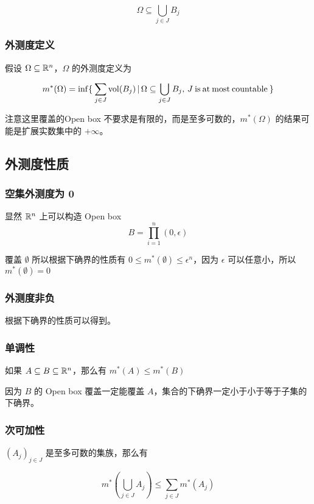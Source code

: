 \[
\Omega \subseteq \bigcup_{j \in J} B_j
\]

\subsubsection{外测度定义}

假设 $\Omega \subseteq \mathbb{R}^n$，$\Omega$ 的外测度定义为

\[
m^*(\Omega) = \inf \{\: \sum_{j \in J}\mathrm{vol}(B_j) \,\vert\, \Omega \subseteq \bigcup_{j \in J}B_j,\, J \: \mathrm{ is \: at \: most \: countable} \:\}
\]

注意这里覆盖的Open box 不要求是有限的，而是至多可数的，$m^*(\Omega)$ 的结果可能是扩展实数集中的 $+\infty$。


\subsection{外测度性质}

\subsubsection{空集外测度为 0}

显然 $\mathbb{R}^n$ 上可以构造 Open box 
\[
B = \prod_{i=1}^{n}(0, \epsilon)
\]

覆盖 $\emptyset$ 所以根据下确界的性质有 $ 0 \le m^*(\emptyset) \le \epsilon^n$，因为 $\epsilon$ 可以任意小，所以 $m^*(\emptyset) = 0$

\subsubsection{外测度非负}

根据下确界的性质可以得到。

\subsubsection{单调性}

如果 $A \subseteq B \subseteq \mathbb{R}^n$，那么有 $m^*(A) \le m^*(B)$

因为 $B$ 的 Open box 覆盖一定能覆盖 $A$，集合的下确界一定小于小于等于子集的下确界。

\subsubsection{次可加性}

$(A_j)_{j \in J}$ 是至多可数的集族，那么有

\[
m^*(\bigcup_{j \in J}A_j) \le \sum_{j \in J}m^*(A_j)
\]

